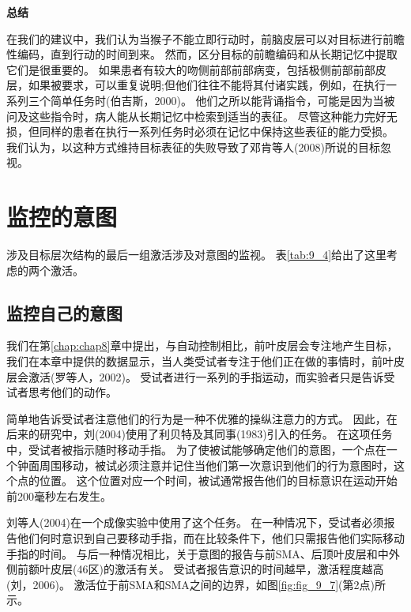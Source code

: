 \textbf{总结}
\par
在我们的建议中，我们认为当猴子不能立即行动时，前脑皮层可以对目标进行前瞻性编码，直到行动的时间到来。
然而，区分目标的前瞻编码和从长期记忆中提取它们是很重要的。
如果患者有较大的吻侧前部前部病变，包括极侧前部前部皮层，如果被要求，可以重复说明;但他们往往不能将其付诸实践，例如，在执行一系列三个简单任务时(伯吉斯，2000)。
他们之所以能背诵指令，可能是因为当被问及这些指令时，病人能从长期记忆中检索到适当的表征。
尽管这种能力完好无损，但同样的患者在执行一系列任务时必须在记忆中保持这些表征的能力受损。
我们认为，以这种方式维持目标表征的失败导致了邓肯等人(2008)所说的目标忽视。



\section{监控的意图}
\par
涉及目标层次结构的最后一组激活涉及对意图的监视。
表\ref{tab:9_4}给出了这里考虑的两个激活。
\par


\subsection{监控自己的意图}
\par
我们在第\ref{chap:chap8}章中提出，与自动控制相比，前叶皮层会专注地产生目标，我们在本章中提供的数据显示，当人类受试者专注于他们正在做的事情时，前叶皮层会激活(罗等人，2002)。
受试者进行一系列的手指运动，而实验者只是告诉受试者思考他们的动作。
\par


简单地告诉受试者注意他们的行为是一种不优雅的操纵注意力的方式。
因此，在后来的研究中，刘(2004)使用了利贝特及其同事(1983)引入的任务。
在这项任务中，受试者被指示随时移动手指。
为了使被试能够确定他们的意图，一个点在一个钟面周围移动，被试必须注意并记住当他们第一次意识到他们的行为意图时，这个点的位置。
这个位置对应一个时间，被试通常报告他们的目标意识在运动开始前200毫秒左右发生。
\par


刘等人(2004)在一个成像实验中使用了这个任务。
在一种情况下，受试者必须报告他们何时意识到自己要移动手指，而在比较条件下，他们只需报告他们实际移动手指的时间。
与后一种情况相比，关于意图的报告与前SMA、后顶叶皮层和中外侧前额叶皮层(46区)的激活有关。
受试者报告意识的时间越早，激活程度越高(刘，2006)。
激活位于前SMA和SMA之间的边界，如图\ref{fig:fig_9_7}(第2点)所示。
\par


